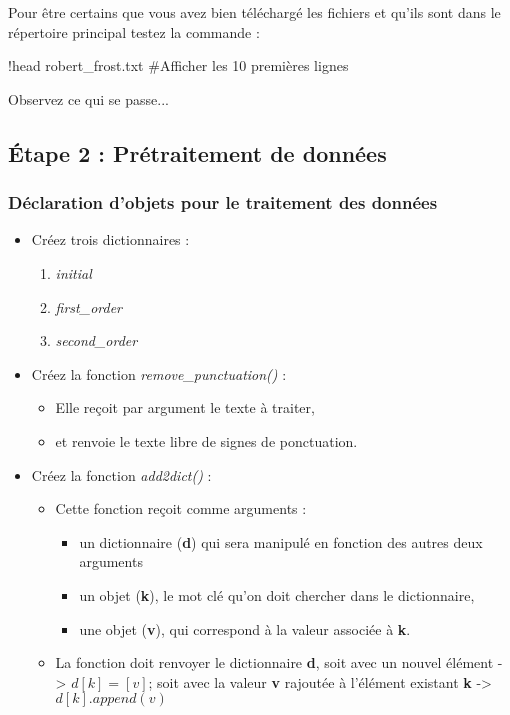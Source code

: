 Pour être certains que vous avez bien téléchargé les fichiers et qu'ils sont dans le répertoire principal testez la commande :

\begin{python} 
	!head robert_frost.txt #Afficher les 10 premières lignes
\end{python}

Observez ce qui se passe...

\subsection{Étape 2 : Prétraitement de données}

\subsubsection{Déclaration d'objets pour le traitement des données}

\begin{itemize}
	\item Créez trois dictionnaires :
	\begin{enumerate}
		\item \textit{initial}
		\item \textit{first\_order}
		\item \textit{second\_order}
	\end{enumerate}
	\item Créez la fonction \textit{remove\_punctuation()} : 
	\begin{itemize}
		\item Elle reçoit par argument le texte à traiter,
		\item et renvoie le texte libre de signes de ponctuation.
	\end{itemize}
	\item Créez la fonction \textit{add2dict()} :
	\begin{itemize}
		\item Cette fonction reçoit comme arguments : 
		\begin{itemize}
			\item un dictionnaire (\textbf{d}) qui sera manipulé en fonction des autres deux arguments
			\item un objet (\textbf{k}), le mot clé qu'on doit chercher dans le dictionnaire,
			\item une objet (\textbf{v}), qui correspond à la valeur associée à \textbf{k}.
		\end{itemize}
		\item La fonction doit renvoyer le dictionnaire \textbf{d}, soit avec un nouvel élément -> $d[k] = [v]$; soit avec la valeur \textbf{v} rajoutée à l'élément existant \textbf{k} -> $d[k].append(v)$
	
	\end{itemize}
\end{itemize}



